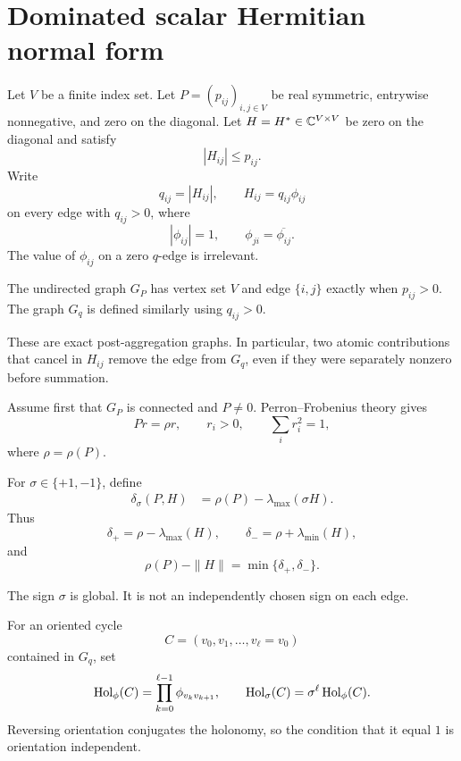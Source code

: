 \section{Dominated scalar Hermitian normal form}
\label{sec:setup}

Let \(V\) be a finite index set.  Let \(P=(p_{ij})_{i,j\in V}\) be
real symmetric, entrywise nonnegative, and zero on the diagonal.  Let
\(H=H^*\in\mathbb C^{V\times V}\) be zero on the diagonal and satisfy
\begin{equation}\label{eq:domination}
 |H_{ij}|\le p_{ij}.
\end{equation}
Write
\[
 q_{ij}=|H_{ij}|,
 \qquad
 H_{ij}=q_{ij}\phi_{ij}
\]
on every edge with \(q_{ij}>0\), where
\[
 |\phi_{ij}|=1,
 \qquad
 \phi_{ji}=\overline{\phi_{ij}}.
\]
The value of \(\phi_{ij}\) on a zero \(q\)-edge is irrelevant.

\begin{definition}\label{def:row-graph}
The undirected graph \(G_P\) has vertex set \(V\) and edge
\(\{i,j\}\) exactly when \(p_{ij}>0\).  The graph \(G_q\) is defined
similarly using \(q_{ij}>0\).
\end{definition}
These are exact post-aggregation graphs.  In particular, two atomic
contributions that cancel in \(H_{ij}\) remove the edge from \(G_q\),
even if they were separately nonzero before summation.

Assume first that \(G_P\) is connected and \(P\ne0\).  Perron--Frobenius
theory \cite{BermanPlemmons1994,HornJohnson2013} gives
\begin{equation}\label{eq:perron}
 Pr=\rho r,
 \qquad
 r_i>0,
 \qquad
 \sum_i r_i^2=1,
\end{equation}
where \(\rho=\rho(P)\).

\begin{definition}\label{def:sectors}
For \(\sigma\in\{+1,-1\}\), define
\begin{align}
 \delta_\sigma(P,H)
 &=
 \rho(P)-\lambda_{\max}(\sigma H).
 \label{eq:sector-defect}
\end{align}
Thus
\[
 \delta_+=\rho-\lambda_{\max}(H),
 \qquad
 \delta_-=\rho+\lambda_{\min}(H),
\]
and
\begin{equation}\label{eq:norm-defect}
 \rho(P)-\|H\|=\min\{\delta_+,\delta_-\}.
\end{equation}
\end{definition}

The sign \(\sigma\) is global.  It is not an independently chosen sign
on each edge.

\begin{definition}\label{def:holonomy}
For an oriented cycle
\[
 C=(v_0,v_1,\ldots,v_\ell=v_0)
\]
contained in \(G_q\), set
\begin{equation}\label{eq:holonomy}
 \operatorname{Hol}_\phi(C)
 =
 \prod_{k=0}^{\ell-1}\phi_{v_kv_{k+1}},
 \qquad
 \operatorname{Hol}_\sigma(C)
 =
 \sigma^\ell\operatorname{Hol}_\phi(C).
\end{equation}
Reversing orientation conjugates the holonomy, so the condition that it
equal \(1\) is orientation independent.
\end{definition}
